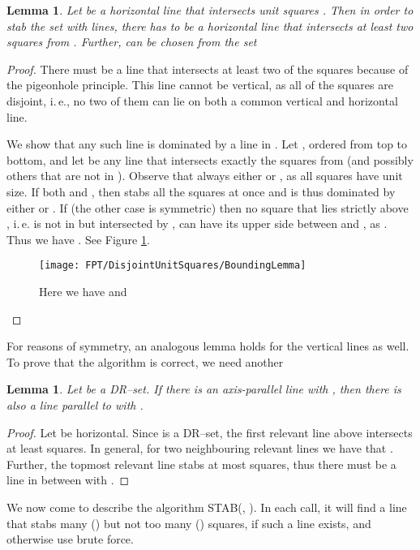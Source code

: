 \documentclass[12pt]{article}
\newtheorem{lemma}[definition]{Lemma}
\begin{document}
\begin{lemma}\label{Lemma:BoundingLemma} 
  Let  be a horizontal line that intersects  unit squares
  . Then in order to stab the set  with  lines, there
  has to be a horizontal line  that intersects at least two squares
  from . Further,  can be chosen from the set
  
\end{lemma}
\begin{proof}
There must be a line that intersects at least two of the squares because of the pigeonhole principle. This line cannot be vertical, as all of the squares are disjoint, i.\,e., no two of them can lie on both a common vertical and horizontal line.

We show that any such line is dominated by a line in . Let , ordered from top to bottom, and let  be any line that intersects exactly the squares  from  (and possibly others that are not in ). Observe that always either  or , as all squares have unit size. If both  and , then  stabs all the squares at once and is thus dominated by either  or . If  (the other case is symmetric) then no square that lies strictly above , i.\,e. is not in  but intersected by , can have its upper side between  and , as . Thus we have . See Figure \ref{fig:BoundingLemma}.
\begin{figure}
	\centering
		\texttt{[image: FPT/DisjointUnitSquares/BoundingLemma]}
	\caption{Here we have  and }
	\label{fig:BoundingLemma}
\end{figure}
\end{proof}
For reasons of symmetry, an analogous lemma holds for the vertical lines as well. To prove that the algorithm is correct, we need another

\begin{lemma}\label{Lemma:IntermediateLemma} Let  be a DR--set. If there is an axis-parallel line  with , then there is also a line  parallel to  with .
\end{lemma}
\begin{proof} Let  be horizontal. Since  is a DR--set, the
  first relevant line above  intersects at least 
  squares. In general, for two neighbouring relevant lines  we have that . Further, the topmost relevant line stabs at most  squares,
  thus there must be a line  in between with . 
\end{proof}

We now come to describe the algorithm STAB(, ). In each call, it will find a line that stabs many () but not too many () squares, if such a line exists, and otherwise use brute force.
\end{document}
